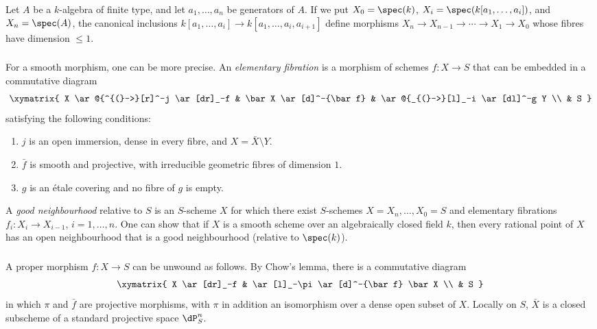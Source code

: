 \documentclass[oneside]{book}
\begin{document}
Let $A$ be a $k$-algebra of finite type, and let $a_1,\dotsc,a_n$ be
generators of $A$. If we put $X_0=\spec(k)$,
$X_i=\spec(k[a_1,\dotsc,a_i])$, and $X_n=\spec(A)$, the canonical
inclusions
$k[a_1,\dotsc,a_i]\to k[a_1,\dotsc,a_i,a_{i+1}]$ define morphisms
$X_n\to X_{n-1}\to\cdots\to X_1\to X_0$ whose fibres have dimension
$\leqslant1$.

\subsubsection{}\label{I:3-4-2}

For a smooth morphism, one can be more precise. An
\emph{elementary fibration} is a morphism of schemes $f:X\to S$ that
can be embedded in a commutative diagram
\[\xymatrix{
  X \ar@{^{(}->}[r]^-j \ar[dr]_-f
    & \bar X \ar[d]^-{\bar f}
    & \ar@{_{(}->}[l]_-i \ar[dl]^-g Y \\
  & S
}\]
satisfying the following conditions:
\begin{enumerate}[\indent i)]
  \item $j$ is an open immersion, dense in every fibre, and
    $X=\bar X\setminus Y$.
  \item $\bar f$ is smooth and projective, with irreducible geometric
    fibres of dimension $1$.
  \item $g$ is an étale covering and no fibre of $g$ is empty.
\end{enumerate}

A \emph{good neighbourhood} relative to $S$ is an $S$-scheme $X$ for
which there exist $S$-schemes $X=X_n,\dotsc,X_0=S$ and elementary
fibrations $f_i:X_i\to X_{i-1}$, $i=1,\dotsc,n$. One can show
\cite[XI 3.3]{sga4} that if $X$ is a smooth scheme over an algebraically
closed field $k$, then every rational point of $X$ has an open
neighbourhood that is a good neighbourhood (relative to $\spec(k)$).

\subsubsection{}\label{I:3-4-3}

A proper morphism $f:X\to S$ can be unwound as follows. By Chow's lemma,
there is a commutative diagram
\[\xymatrix{
  X \ar[dr]_-f
    & \ar[l]_-\pi \ar[d]^-{\bar f} \bar X \\
  & S
}\]
in which $\pi$ and $\bar f$ are projective morphisms, with $\pi$ in
addition an isomorphism over a dense open subset of $X$. Locally on
$S$, $\bar X$ is a closed subscheme of a standard projective space
$\dP_S^n$.
\end{document}
